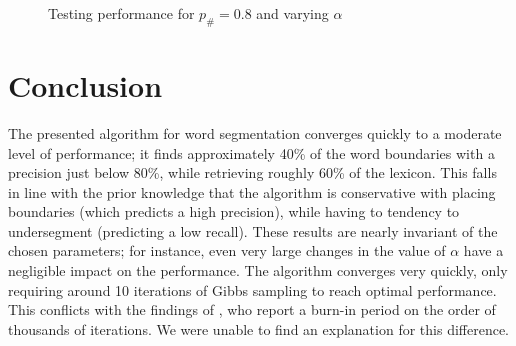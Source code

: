 \documentclass[11pt]{article}
\begin{document}
\begin{figure}[h!]
  \centering
  \caption{Testing performance for $p_\# = 0.8$ and varying $\alpha$}
  \label{fig:p08}
\end{figure}

\FloatBarrier
\section{Conclusion}
The presented algorithm for word segmentation converges quickly to a moderate
level of performance; it finds approximately 40\% of the word boundaries with a
precision just below 80\%, while retrieving roughly 60\% of the lexicon. This
falls in line with the prior knowledge that the algorithm is conservative with
placing boundaries (which predicts a high precision), while having to tendency
to undersegment (predicting a low recall). These results are nearly invariant of
the chosen parameters; for instance, even very large changes in the value of
$\alpha$ have a negligible impact on the performance. The algorithm converges
very quickly, only requiring around 10 iterations of Gibbs sampling to reach
optimal performance. This conflicts with the findings of \cite{goldwater2009},
who report a burn-in period on the order of thousands of iterations. We were
unable to find an explanation for this difference.



\end{document}
